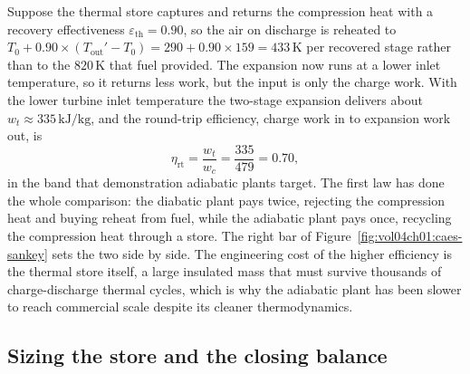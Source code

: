Suppose the thermal store captures and returns the compression heat with
a recovery effectiveness $\varepsilon_{\text{th}} = 0.90$, so the air on
discharge is reheated to $T_0 + 0.90 \times (T_{\text{out}}' - T_0) =
290 + 0.90 \times 159 = 433\,\si{\kelvin}$ per recovered stage rather
than to the $820\,\si{\kelvin}$ that fuel provided. The expansion now runs
at a lower inlet temperature, so it returns less work, but the input is
only the charge work. With the lower turbine inlet temperature the
two-stage expansion delivers about $w_t \approx 335\,\text{kJ}/\text{kg}$,
and the round-trip efficiency, charge work in to expansion work out, is
\[
\eta_{\text{rt}} = \frac{w_t}{w_c}
  = \frac{335}{479} = 0.70,
\]
in the band that demonstration adiabatic plants target. The first law has
done the whole comparison: the diabatic plant pays twice, rejecting the
compression heat and buying reheat from fuel, while the adiabatic plant
pays once, recycling the compression heat through a store. The right bar
of Figure~\ref{fig:vol04ch01:caes-sankey} sets the two side by side. The
engineering cost of the higher efficiency is the thermal store itself, a
large insulated mass that must survive thousands of charge-discharge
thermal cycles, which is why the adiabatic plant has been slower to reach
commercial scale despite its cleaner thermodynamics.



\subsection{Sizing the store and the closing balance}

